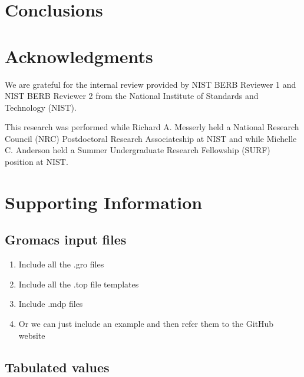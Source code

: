 \documentclass[preprint,review,12pt]{elsarticle}
\begin{document}
\section{Conclusions}

\section*{Acknowledgments}

We are grateful for the internal review provided by NIST BERB Reviewer 1 and NIST BERB Reviewer 2 from the National Institute of Standards and Technology (NIST). 

This research was performed while Richard A. Messerly held a National Research Council (NRC) Postdoctoral Research Associateship at NIST and while Michelle C. Anderson held a Summer Undergraduate Research Fellowship (SURF) position at NIST.

\section{Supporting Information}

\subsection{Gromacs input files}

\begin{enumerate}
	\item Include all the .gro files
	\item Include all the .top file templates
	\item Include .mdp files
	\item Or we can just include an example and then refer them to the GitHub website
\end{enumerate}

\subsection{Tabulated values}
\end{document}
